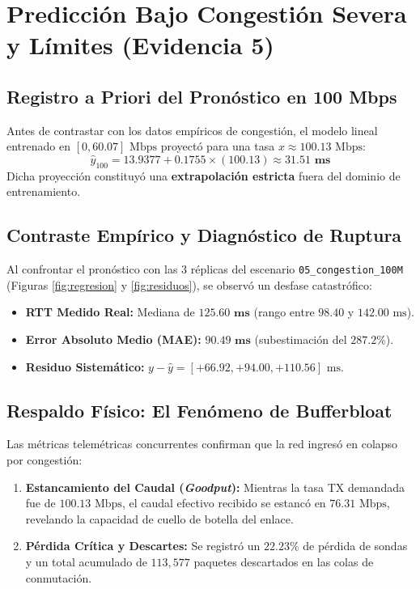 \documentclass[10pt,twocolumn,letterpaper]{article}
\begin{document}
\section{Predicción Bajo Congestión Severa y Límites (Evidencia 5)}

\subsection{Registro a Priori del Pronóstico en 100 Mbps}
Antes de contrastar con los datos empíricos de congestión, el modelo lineal entrenado en $[0, 60.07]\text{ Mbps}$ proyectó para una tasa $x \approx 100.13\text{ Mbps}$:
\begin{equation}
    \hat{y}_{100} = 13.9377 + 0.1755 \times (100.13) \approx \mathbf{31.51\text{ ms}}
\end{equation}
Dicha proyección constituyó una \textbf{extrapolación estricta} fuera del dominio de entrenamiento.

\subsection{Contraste Empírico y Diagnóstico de Ruptura}
Al confrontar el pronóstico con las 3 réplicas del escenario \texttt{05\_congestion\_100M} (Figuras \ref{fig:regresion} y \ref{fig:residuos}), se observó un desfase catastrófico:
\begin{itemize}
    \item \textbf{RTT Medido Real:} Mediana de $\mathbf{125.60\text{ ms}}$ (rango entre $98.40$ y $142.00\text{ ms}$).
    \item \textbf{Error Absoluto Medio (MAE):} $\mathbf{90.49\text{ ms}}$ (subestimación del $287.2\%$).
    \item \textbf{Residuo Sistemático:} $y - \hat{y} = [+66.92, +94.00, +110.56]\text{ ms}$.
\end{itemize}

\subsection{Respaldo Físico: El Fenómeno de Bufferbloat}
Las métricas telemétricas concurrentes confirman que la red ingresó en colapso por congestión:
\begin{enumerate}
    \item \textbf{Estancamiento del Caudal (\textit{Goodput}):} Mientras la tasa TX demandada fue de $100.13\text{ Mbps}$, el caudal efectivo recibido se estancó en $76.31\text{ Mbps}$, revelando la capacidad de cuello de botella del enlace.
    \item \textbf{Pérdida Crítica y Descartes:} Se registró un $22.23\%$ de pérdida de sondas y un total acumulado de $113{,}577$ paquetes descartados en las colas de conmutación.
\end{enumerate}
\end{document}
